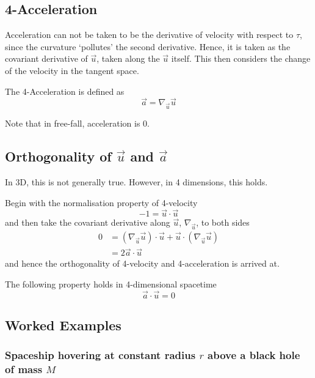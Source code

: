 \subsection{4-Acceleration}
Acceleration can not be taken to be the derivative of velocity with respect to $\tau$, since the curvature `pollutes' the second derivative. Hence, it is taken as the covariant derivative of $\vec{u}$, taken along the $\vec{u}$ itself. This then considers the change of the velocity in the tangent space.
\begin{definition}[4-Acceleration]
    The 4-Acceleration is defined as
    $$ \vec{a} = \nabla_{\vec{u}} \vec{u} $$
\end{definition}

Note that in free-fall, acceleration is $0$.

\subsection{Orthogonality of $\vec{u}$ and $\vec{a}$}
In 3D, this is not generally true. However, in 4 dimensions, this holds. \par Begin with the  normalisation property of 4-velocity
$$ -1 = \vec{u} \cdot \vec{u} $$
and then take the covariant derivative along $\vec{u}$, $\nabla_{\vec{u}}$, to both sides
\begin{align*}
    0 & = \left(\nabla_{\vec{u}} \vec{u}\right) \cdot \vec{u} + \vec{u} \cdot \left(\nabla_{\vec{u}} \vec{u}\right) \\ & = 2\vec{a} \cdot \vec{u}
\end{align*}
and hence the orthogonality of 4-velocity and 4-acceleration is arrived at.
\begin{definition}
\label{def:4_orthog}
    The following property holds in 4-dimensional spacetime
    $$ \vec{a}\cdot \vec{u} = 0 $$
\end{definition}

\subsection{Worked Examples}
\subsubsection{Spaceship hovering at constant radius $r$ above a black hole of mass $M$}

